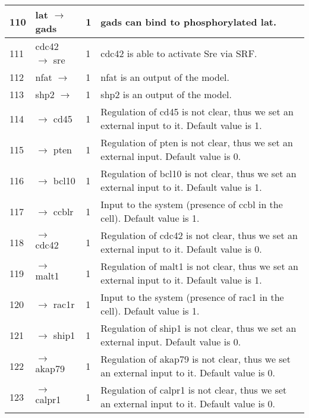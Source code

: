 \documentclass[a4paper, 12pt,epsfig, onecolumn]{article}
\begin{document}
{\begin{center}
\begin{longtable}{|p{}|p{}|p{}|p{}|}
110& lat $\rightarrow$ gads  &1& gads can bind to phosphorylated lat\cite{TogniM_MolImm_04,HorejsiV_NatRevImm_04}. \\ \hline
111& cdc42 $\rightarrow$ sre   &1& cdc42 is able to activate Sre via SRF\cite{hill:1995}. \\ \hline
112 & nfat $\rightarrow$  &1& nfat is an output of the model. \\ \hline
113 & shp2 $\rightarrow$  &1& shp2 is an output of the        model.  \\ \hline
114&       $\rightarrow$ cd45 &1& Regulation of cd45 is not clear, thus we set an external input to it. Default value is 1.\\ \hline
115&       $\rightarrow$ pten &1& Regulation of pten is not clear, thus we set an external input. Default value is 0.\\ \hline
116&      $\rightarrow$ bcl10 &1& Regulation of bcl10 is not clear, thus we set an external input to it. Default value is 1.\\ \hline
117&      $\rightarrow$ ccblr &1& Input to the system (presence of ccbl in the cell). Default value is 1.\\ \hline
118&      $\rightarrow$ cdc42 &1& Regulation of  cdc42 is not clear, thus we set an external input to it. Default value is 0.\\ \hline
119&      $\rightarrow$ malt1 &1& Regulation of malt1 is not clear, thus we set an external input to it. Default value is 1.\\ \hline
120&      $\rightarrow$ rac1r &1& Input to the system (presence of rac1 in the cell). Default value is 1.\\ \hline
121&      $\rightarrow$ ship1 &1& Regulation of ship1 is not clear, thus we set an external input. Default value is 0.\\ \hline
122&     $\rightarrow$ akap79 &1& Regulation of akap79 is not clear, thus we set an external input to it. Default value is 0.\\ \hline
123&     $\rightarrow$ calpr1 &1& Regulation of calpr1 is not clear, thus we set an external input to it. Default value is 0.\\ \hline


\end{longtable}
\end{center}


}

\renewcommand{\familydefault}{\rmdefault} 

\newpage
%


\end{document}
